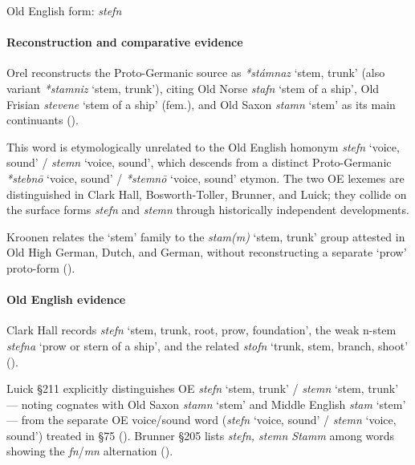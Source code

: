 \documentclass[
  british,
  a4paper,
]{article}
\providecommand{\Recon}[1]{\emph{*#1}}
\begin{document}
Old English form: \emph{stefn}

\paragraph{Reconstruction and comparative
evidence}\label{reconstruction-and-comparative-evidence-106}

Orel reconstructs the Proto-Germanic source as \Recon{stámnaz} `stem,
trunk' (also variant \Recon{stamniz} `stem, trunk'), citing Old Norse
{\emph{stafn}} `stem of a ship', Old Frisian {\emph{stevene}} `stem of a
ship' (fem.), and Old Saxon {\emph{stamn}} `stem' as its main
continuants ().

This word is etymologically unrelated to the Old English homonym
\emph{stefn} `voice, sound' / \emph{stemn} `voice, sound', which
descends from a distinct Proto-Germanic \Recon{stebnō} `voice, sound' /
\Recon{stemnō} `voice, sound' etymon. The two OE lexemes are
distinguished in Clark Hall, Bosworth-Toller, Brunner, and Luick; they
collide on the surface forms \emph{stefn} and \emph{stemn} through
historically independent developments.

Kroonen relates the `stem' family to the \emph{stam(m)} `stem, trunk'
group attested in Old High German, Dutch, and German, without
reconstructing a separate `prow' proto-form
().

\paragraph{Old English evidence}\label{old-english-evidence-106}

Clark Hall records {\emph{stefn}} `stem, trunk, root, prow, foundation',
the weak n-stem {\emph{stefna}} `prow or stern of a ship', and the
related {\emph{stofn}} `trunk, stem, branch, shoot'
().

Luick §211 explicitly distinguishes OE \emph{stefn} `stem, trunk' /
\emph{stemn} `stem, trunk' --- noting cognates with Old Saxon
{\emph{stamn}} `stem' and Middle English {\emph{stam}} `stem' --- from
the separate OE voice/sound word (\emph{stefn} `voice, sound' /
\emph{stemn} `voice, sound') treated in §75
(). Brunner §205
lists \emph{stefn, stemn Stamm} among words showing the
\emph{fn}/\emph{mn} alternation
().
\end{document}
